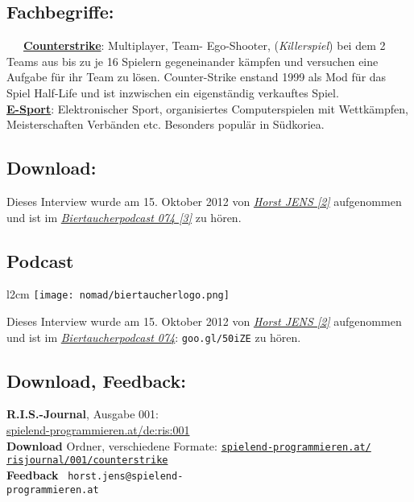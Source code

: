 \subsection*{Fachbegriffe:}

~~~\href{http://de.wikipedia.org/wiki/Counter-Strike}{\textbf{Counterstrike}}: Multiplayer, Team- Ego-Shooter, (\textit{Killerspiel}) bei dem 2 Teams aus bis zu je 16 Spielern gegeneinander kämpfen und versuchen eine Aufgabe für ihr Team zu lösen. Counter-Strike enstand 1999 als Mod für das Spiel Half-Life und ist inzwischen ein eigenständig verkauftes Spiel.  \\

\href{http://de.wikipedia.org/wiki/E-Sport}{\textbf{E-Sport}}: Elektronischer Sport, organisiertes Computerspielen mit Wettkämpfen, Meisterschaften Verbänden etc. Besonders populär in Südkoriea. \\

\subsection*{Download:}
Dieses Interview  wurde am 15. Oktober 2012 von \href{http://spielend-programmieren.at}{\textit{Horst JENS [2]}} aufgenommen und ist im \href{http://spielend-programmieren.at/de:podcast:biertaucher:2012:074}{\textit{Biertaucherpodcast 074 [3]}} zu hören.  

\subsection*{Podcast}
\begin{wrapfigure}{l}{2cm}
\texttt{[image: nomad/biertaucherlogo.png]}
\end{wrapfigure}
Dieses Interview  wurde am 15. Oktober 2012 von \href{http://spielend-programmieren.at}{\textit{Horst JENS [2]}} aufgenommen und ist im \href{http://spielend-programmieren.at/de:podcast:biertaucher:2012:074}{\textit{Biertaucherpodcast 074}}: \texttt{goo.gl/50iZE} zu hören.

\subsection*{Download, Feedback:}
\textbf{R.I.S.-Journal}, Ausgabe 001: \\
\href{http://spielend-programmieren.at/de:ris:001}{spielend-programmieren.at/de:ris:001}\\
\textbf{Download} Ordner, verschiedene Formate: \href{http://spielend-programmieren.at/risjournal/001/counterstrike}{\texttt{spielend-programmieren.at/\\risjournal/001/counterstrike}} \\
\textbf{Feedback} \Letter\ \texttt{horst.jens@spielend-\\programmieren.at} \\


